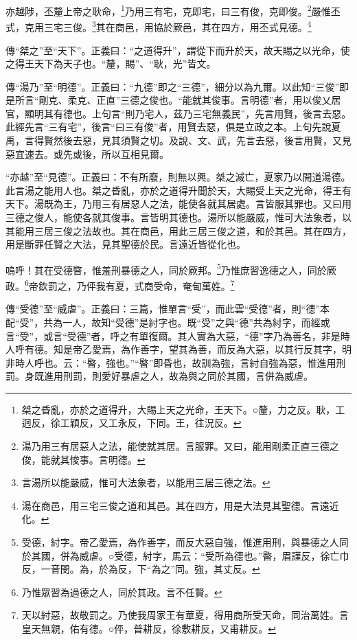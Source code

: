 亦越陟，丕釐上帝之耿命，\footnote{桀之昏亂，亦於之道得升，大賜上天之光命，王天下。○釐，力之反。耿，工迥反，徐工穎反，又工永反，下同。王，往況反。}乃用三有宅，克即宅，曰三有俊，克即俊。\footnote{湯乃用三有居惡人之法，能使就其居。言服罪。又曰，能用剛柔正直三德之俊，能就其悛事。言明德。}嚴惟丕式，克用三宅三俊。\footnote{言湯所以能嚴威，惟可大法象者，以能用三居三德之法。}其在商邑，用協於厥邑，其在四方，用丕式見德。\footnote{湯在商邑，用三宅三俊之道和其邑。其在四方，用是大法見其聖德。言遠近化。}


{\noindent\zhuan{}\fzbyks 傳“桀之”至“天下”。正義曰：“之道得升”，謂從下而升於天，故天賜之以光命，使之得王天下為天子也。“釐，賜”、“耿，光”皆文。 \par}

{\noindent\zhuan{}\fzbyks 傳“湯乃”至“明德”。正義曰：“九德”即之“三德”，細分以為九爾。以此知“三俊”即是所言“剛克、柔克、正直”三德之俊也。“能就其俊事。言明德”者，用以俊乂居官，顯明其有德也。上句言“則乃宅人，茲乃三宅無義民”，先言用賢，後言去惡。此經先言“三有宅”，後言“曰三有俊”者，用賢去惡，俱是立政之本。上句先說夏禹，言得賢然後去惡，見其須賢之切。及說、文、武，先言去惡，後言用賢，又見惡宜速去。或先或後，所以互相見爾。 \par}

{\noindent\shu{}\fzkt “亦越”至“見德”。正義曰：不有所廢，則無以興。桀之滅亡，夏家乃以開道湯德。此言湯之能用人也。桀之昏亂，亦於之道得升聞於天，大賜受上天之光命，得王有天下。湯既為王，乃用三有居惡人之法，能使各就其居處。言皆服其罪也。又曰用三德之俊人，能使各就其俊事。言皆明其德也。湯所以能嚴威，惟可大法象者，以其能用三居三俊之法故也。其在商邑，用此三居三俊之道，和於其邑。其在四方，用是斷罪任賢之大法，見其聖德於民。言遠近皆從化也。 \par}

嗚呼！其在受德暋，惟羞刑暴德之人，同於厥邦。\footnote{受德，紂字。帝乙愛焉，為作善字，而反大惡自強，惟進用刑，與暴德之人同於其國，併為威虐。○受德，紂字，馬云：“受所為德也。”暋，眉謹反，徐亡巾反，一音閔。為，於為反，下“為之”同。強，其丈反。}乃惟庶習逸德之人，同於厥政。\footnote{乃惟眾習為過德之人，同於其政。言不任賢。}帝欽罰之，乃伻我有夏，式商受命，奄甸萬姓。\footnote{天以紂惡，故敬罰之。乃使我周家王有華夏，得用商所受天命，同治萬姓。言皇天無親，佑有德。○伻，普耕反，徐敷耕反，又甫耕反。}


{\noindent\zhuan{}\fzbyks 傳“受德”至“威虐”。正義曰：三篇，惟單言“受”，而此雲“受德”者，則“德”本配“受”，共為一人，故知“受德”是紂字也。既“受”之與“德”共為紂字，而經或言“受”，或言“受德”者，呼之有單復爾。其人實為大惡，“德”字乃為善名，非是時人呼有德。知是帝乙愛焉，為作善字，望其為善，而反為大惡，以其行反其字，明非時人呼也。云：“暋，強也。”“暋”即昏也，故訓為強，言紂自強為惡，惟進用刑罰。身既進用刑罰，則愛好暴虐之人，故為與之同於其國，言併為威虐。 \par}

